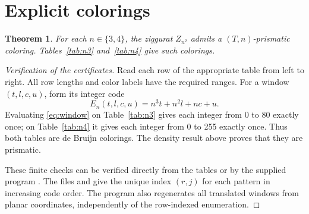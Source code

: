\documentclass[11pt]{article}
\newtheorem{theorem}{Theorem}
\begin{document}
\section{Explicit colorings}
\begin{theorem}\label{thm:main}
For each $n\in\{3,4\}$, the ziggurat $Z_{n^2}$ admits a
$(T,n)$-prismatic coloring. Tables~\ref{tab:n3} and~\ref{tab:n4}
give such colorings.
\end{theorem}
\begin{proof}[Verification of the certificates]
Read each row of the appropriate table from left to right. All row
lengths and color labels have the required ranges. For a window
$(t,l,c,u)$, form its integer code
\[
 E_n(t,l,c,u)=n^3t+n^2l+nc+u.
\]
Evaluating \eqref{eq:window} on Table~\ref{tab:n3} gives each integer
from 0 to 80 exactly once; on Table~\ref{tab:n4} it gives each integer
from 0 to 255 exactly once. Thus both tables are de Bruijn colorings.
The density result above proves that they are prismatic.

These finite checks can be verified directly from the tables or by the
supplied program . The files  and
 give the unique index $(r,j)$ for each pattern
in increasing code order. The program also regenerates all translated
windows from planar coordinates, independently of the row-indexed
enumeration.
\end{proof}
\end{document}
